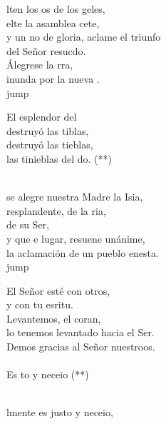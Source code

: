 \begin{cancion}%
	lten los os de los geles,\\
	elte la asamblea cete,\\
	y un no de gloria, aclame el triunfo\\
	del Señor resucdo.\\
	Álegrese la rra,\\
	inunda por la nueva .\\jump\\
	\begin{chorus}%
	El esplendor del \\
	destruyó las tiblas,\\
	destruyó las tieblas,\\
	las tinieblas del do. (**)\\
	\end{chorus}%
	\jump\\
	 se alegre nuestra Madre la Isia,\\
	resplandente, de la ria,\\
	de su Ser,\\
	y que e lugar, resuene unánime,\\
	la aclamación de un pueblo enesta.\\jump\\
	\begin{chorus}%
	El Señor esté con otros,\\
	y con tu esritu.\\
	Levantemos, el coran,\\
	lo tenemos levantado hacia el Ser.\\
	Demos gracias al Señor nuestroos.\\
	\jump\\
	Es to y neceio (**)\\
	\end{chorus}%
	\jump\\
	lmente es justo y neceio,\\

\end{cancion}
